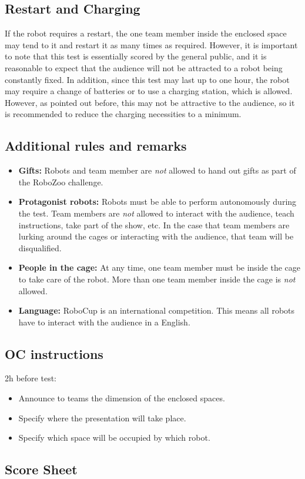 \subsection{Restart and Charging}
If the robot requires a restart, the one team member inside the enclosed space may tend to it and restart it as many times as required. 
However, it is important to note that this test is essentially scored by the general public, and it is reasonable to expect that the audience will not be attracted to a robot being constantly fixed. 
In addition, since this test may last up to one hour, the robot may require a change of batteries or to use a charging station, which is allowed. 
However, as pointed out before, this may not be attractive to the audience, so it is recommended to reduce the charging necessities to a minimum. 

\subsection{Additional rules and remarks}

\begin{itemize}
\item \textbf{Gifts:} Robots and team member are \emph{not} allowed to hand out gifts as part of the RoboZoo challenge. 
\item \textbf{Protagonist robots:} Robots must be able to perform autonomously during the test. 
Team members are \emph{not} allowed to interact with the audience, teach instructions, take part of the show, etc. 
In the case that team members are lurking around the cages or interacting with the audience, that team will be disqualified.
\item \textbf{People in the cage:} At any time, one team member must be inside the cage to take care of the robot. 
More than one team member inside the cage is \emph{not} allowed.
\item \textbf{Language:} RoboCup is an international competition. This means all robots have to interact with the audience in a English. 
\end{itemize}

\subsection{OC instructions}

2h before test:
\begin{itemize}
\item{Announce to teams the dimension of the enclosed spaces.}
\item{Specify where the presentation will take place.}
\item{Specify which space will be occupied by which robot.}
\end{itemize}

\subsection{Score Sheet}




